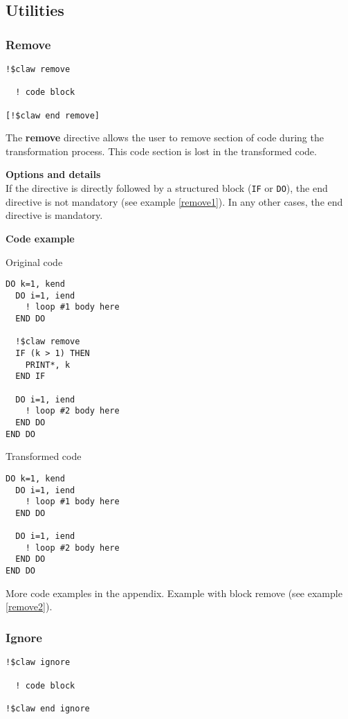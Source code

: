 \subsection{Utilities}

\subsubsection{Remove}
\begin{lstlisting}
!$claw remove

  ! code block
  
[!$claw end remove]
\end{lstlisting}

The \textbf{remove} directive allows the user to remove section of code
during the transformation process. This code section is lost in the 
transformed code.

\textbf{Options and details}\\
If the directive is directly followed by a structured block (\lstinline!IF! or \lstinline!DO!), the
end directive is not mandatory (see example \ref{remove1}). In any other cases, the end
directive is mandatory.

\textbf{Code example}
\label{remove1}

Original code
\begin{lstlisting}
DO k=1, kend
  DO i=1, iend
    ! loop #1 body here
  END DO

  !$claw remove
  IF (k > 1) THEN
    PRINT*, k
  END IF

  DO i=1, iend
    ! loop #2 body here
  END DO
END DO
\end{lstlisting}

Transformed code
\begin{lstlisting}
DO k=1, kend
  DO i=1, iend
    ! loop #1 body here
  END DO

  DO i=1, iend
    ! loop #2 body here
  END DO
END DO
\end{lstlisting}

More code examples in the appendix. Example with block remove (see example \ref{remove2}).


\subsubsection{Ignore}
\begin{lstlisting}
!$claw ignore

  ! code block
  
!$claw end ignore
\end{lstlisting}

